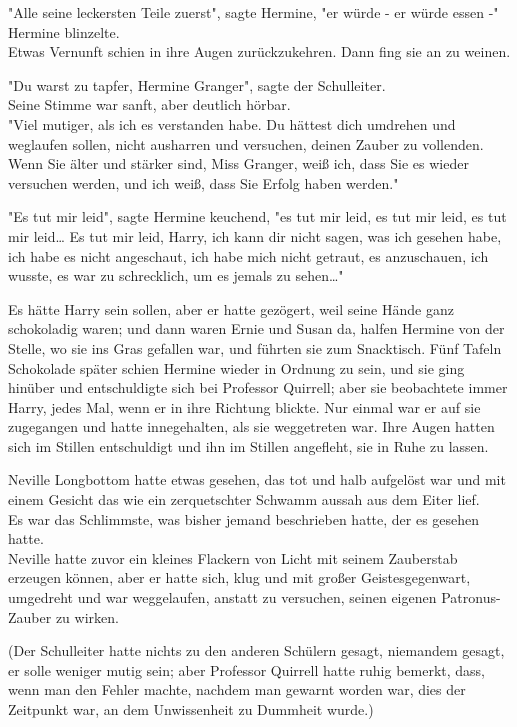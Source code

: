 {"Alle seine leckersten Teile zuerst", sagte Hermine, "er würde - er würde essen -"\\ Hermine blinzelte.\\ Etwas Vernunft schien in ihre Augen zurückzukehren. Dann fing sie an zu weinen.

"Du warst zu tapfer, Hermine Granger", sagte der Schulleiter.\\ Seine Stimme war sanft, aber deutlich hörbar.\\ "Viel mutiger, als ich es verstanden habe. Du hättest dich umdrehen und weglaufen sollen, nicht ausharren und versuchen, deinen Zauber zu vollenden. Wenn Sie älter und stärker sind, Miss Granger, weiß ich, dass Sie es wieder versuchen werden, und ich weiß, dass Sie Erfolg haben werden."

"Es tut mir leid", sagte Hermine keuchend, "es tut mir leid, es tut mir leid, es tut mir leid… Es tut mir leid, Harry, ich kann dir nicht sagen, was ich gesehen habe, ich habe es nicht angeschaut, ich habe mich nicht getraut, es anzuschauen, ich wusste, es war zu schrecklich, um es jemals zu sehen…"

Es hätte Harry sein sollen, aber er hatte gezögert, weil seine Hände ganz schokoladig waren; und dann waren Ernie und Susan da, halfen Hermine von der Stelle, wo sie ins Gras gefallen war, und führten sie zum Snacktisch. Fünf Tafeln Schokolade später schien Hermine wieder in Ordnung zu sein, und sie ging hinüber und entschuldigte sich bei Professor Quirrell; aber sie beobachtete immer Harry, jedes Mal, wenn er in ihre Richtung blickte. Nur einmal war er auf sie zugegangen und hatte innegehalten, als sie weggetreten war. Ihre Augen hatten sich im Stillen entschuldigt und ihn im Stillen angefleht, sie in Ruhe zu lassen.

Neville Longbottom hatte etwas gesehen, das tot und halb aufgelöst war und mit einem Gesicht das wie ein zerquetschter Schwamm aussah aus dem Eiter lief.\\ Es war das Schlimmste, was bisher jemand beschrieben hatte, der es gesehen hatte.\\ Neville hatte zuvor ein kleines Flackern von Licht mit seinem Zauberstab erzeugen können, aber er hatte sich, klug und mit großer Geistesgegenwart, umgedreht und war weggelaufen, anstatt zu versuchen, seinen eigenen Patronus-Zauber zu wirken.

(Der Schulleiter hatte nichts zu den anderen Schülern gesagt, niemandem gesagt, er solle weniger mutig sein; aber Professor Quirrell hatte ruhig bemerkt, dass, wenn man den Fehler machte, nachdem man gewarnt worden war, dies der Zeitpunkt war, an dem Unwissenheit zu Dummheit wurde.)

}
